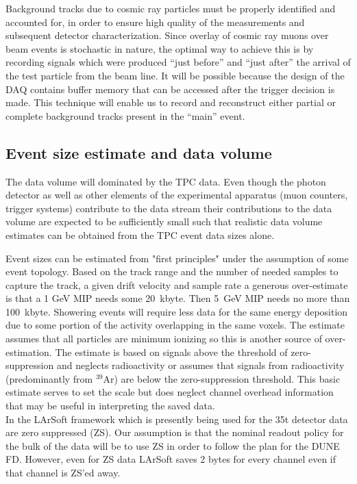 Background tracks due to cosmic ray particles must be properly identified and accounted for, in order to ensure high quality of the measurements and subsequent detector characterization. Since overlay of cosmic
ray muons over beam events is stochastic in nature, the optimal way to achieve this is by recording signals which were 
produced ``just before'' and ``just after'' the arrival of the test particle from the beam line. 
It will be possible because the design of the DAQ contains buffer memory that
can be accessed after the trigger decision is made. 
This technique will enable us to record and reconstruct either partial or complete background
tracks present in the ``main'' event.


\subsection{Event size estimate and data volume}

The data volume will dominated by the TPC data. Even though the photon detector as well as  other elements of the experimental apparatus 
(muon counters, trigger systems) contribute to the data stream their contributions to the data volume are expected to be sufficiently small 
such that realistic data volume estimates can be obtained from the TPC event data sizes alone.

Event sizes  can be estimated from "first principles" under the assumption of some event topology.
Based on the track range and the number of needed samples to capture the track, a given drift velocity and sample rate
a generous over-estimate is that a 1 GeV MIP needs some 20~kbyte. Then 5~GeV MIP needs no more than 100~kbyte.
Showering events will require less data for the same energy deposition
due to some portion of the activity overlapping in the same voxels.
The estimate assumes that all particles are minimum ionizing so this is
another source of over-estimation.
The estimate is based on signals above the threshold of zero-suppression and neglects
radioactivity or assumes that signals from radioactivity (predominantly from $^{39}$Ar) are below the zero-suppression threshold.
This basic estimate serves to set the scale but does neglect channel overhead information that may be useful in 
interpreting the saved data.\\

In the LArSoft framework which is presently being used for the 35t detector
data are zero suppressed (ZS). 
Our assumption is that the nominal readout policy for the bulk of the data
will be to use ZS in order to follow the plan for the DUNE FD.
However, even for 
ZS data LArSoft saves 2 bytes for every channel even if that channel is
ZS'ed away. 

